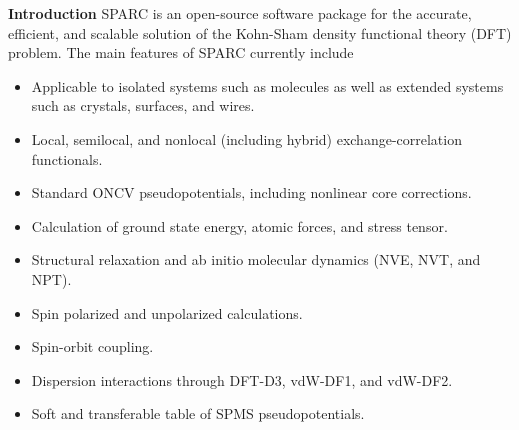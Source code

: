 \begin{frame}[allowframebreaks]{\textbf{Introduction}} \label{Introduction}
  SPARC is an open-source software package for the accurate, efficient, and scalable solution of the Kohn-Sham density functional theory (DFT) problem. The main features of SPARC currently include
  \begin{itemize}
    \item Applicable to isolated systems such as molecules as well as extended systems such as crystals, surfaces, and wires.
    \item Local, semilocal, and nonlocal (including hybrid) exchange-correlation functionals.
    \item Standard ONCV pseudopotentials, including nonlinear core corrections.
    \item Calculation of ground state energy, atomic forces, and stress tensor.
    \item Structural relaxation and ab initio molecular dynamics (NVE, NVT, and NPT).
    \item Spin polarized and unpolarized calculations.
    \item Spin-orbit coupling.
    \item Dispersion interactions through DFT-D3, vdW-DF1, and vdW-DF2.
    \item Soft and transferable table of SPMS pseudopotentials.
  \end{itemize}
  
  \end{frame}

